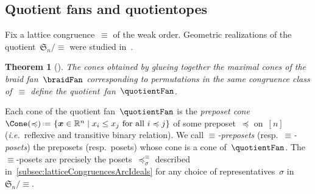 \documentclass{amsart}
\newtheorem{theorem}{Theorem}[section]
\newtheorem{corollary}[theorem]{Corollary}
\theoremstyle{definition}
\newcommand{\R}{\mathbb{R}} %
\newcommand{\f}[1]{{\mathfrak{#1}}} %
\renewcommand{\b}[1]{{\boldsymbol{#1}}} %
\newcommand{\set}[2]{\left\{ #1 \;\middle|\; #2 \right\}} %
\newcommand{\eqdef}{\mbox{\,\raisebox{0.2ex}{\scriptsize\ensuremath{\mathrm:}}\ensuremath{=}\,}} %
\newcommand{\ie}{\textit{i.e.}~} %
\newcommand{\darkblue}{\color{darkblue}} %
\newcommand{\defn}[1]{\textsl{\darkblue #1}} %
\newcommand{\Vincent}[1]{\todo[color=blue!30,inline]{#1 \\ \hfill --- V.}}
\newcommand{\arcs}{{\mathcal{A}}} %
\begin{document}
%
%
%
%


\subsection{Quotient fans and quotientopes}
\label{subsec:quotientFansQuotientopes}

Fix a lattice congruence~$\equiv$ of the weak order.
Geometric realizations of the quotient~$\f{S}_n / {\equiv}$ were studied in~\cite{Reading-HopfAlgebras, PilaudSantos-quotientopes, PadrolPilaudRitter}.

\begin{theorem}[\cite{Reading-HopfAlgebras}]
The cones obtained by glueing together the maximal cones of the braid fan~$\braidFan$ corresponding to permutations in the same congruence class of~$\equiv$ define the \defn{quotient~fan}~$\quotientFan$.
\end{theorem}

Each cone of the quotient fan~$\quotientFan$ is the \defn{preposet cone} $\Cone({\preccurlyeq}) \eqdef \set{\b{x} \in \R^n}{x_i \le x_j \text{ for all } i \preccurlyeq j}$ of some preposet~$\preccurlyeq$ on~$[n]$ (\ie reflexive and transitive binary relation).
We call \defn{$\equiv$-preposets} (resp.~\defn{$\equiv$-posets}) the preposets (resp.~posets) whose cone is a cone of~$\quotientFan$.
The $\equiv$-posets are precisely the posets~$\preccurlyeq^\equiv_\sigma$ described in~\cref{subsec:latticeCongruencesArcIdeals} for any choice of representatives~$\sigma$ in~$\f{S}_n/{\equiv}$.
\end{document}
